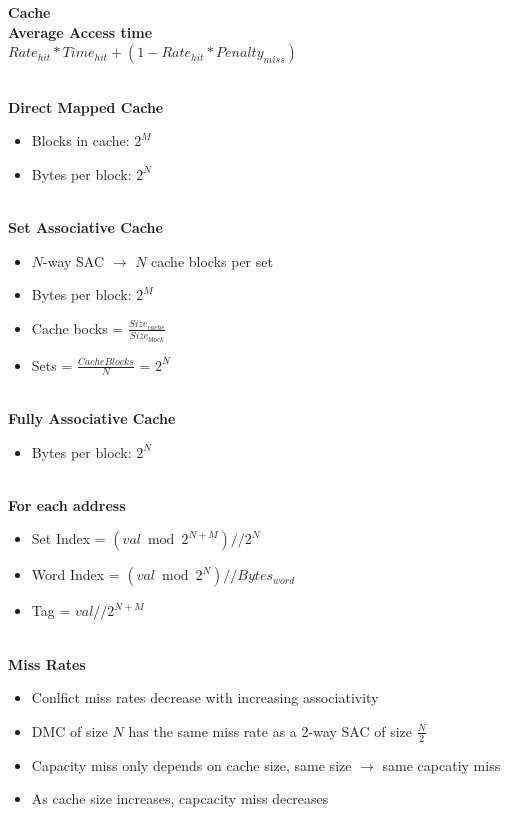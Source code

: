 \documentclass[a4paper]{article} \usepackage[backend=biber, style=numeric, sorting=none]{biblatex}
\begin{document}
\begin{multicols*}{4}
{\small\textbf{Cache}}
\\ \textbf{{Average Access time}}
\\ $Rate_{hit} * Time_{hit} + (1 - Rate_{hit} * Penalty_{miss})$

\\ \textbf{{Direct Mapped Cache}}
\begin{itemize}[leftmargin=*]
\itemsep -0.5em
\item Blocks in cache: $2^M$
\item Bytes per block: $2^N$
\end{itemize}

\\ \textbf{{Set Associative Cache}}
\begin{itemize}[leftmargin=*]
\itemsep -0.5em
\item $N$-way SAC $\rightarrow$ $N$ cache blocks per set
\item Bytes per block: $2^M$
\item Cache bocks = $\frac{Size_{cache}}{Size_{block}}$
\item Sets = $\frac{CacheBlocks}{N}$ = $2^N$
\end{itemize}

\\ \textbf{{Fully Associative Cache}}
\begin{itemize}[leftmargin=*]
\itemsep -0.5em
\item Bytes per block: $2^N$
\end{itemize}

\\ \textbf{{For each address}}
\begin{itemize}[leftmargin=*]
\itemsep -0.5em
\item Set Index =  $(val \bmod 2^{N + M}) // 2^N$
\item Word Index =  $(val \bmod 2^{N}) // Bytes_{word}$
\item Tag =  $val // 2^{N + M}$
\end{itemize}

\\ \textbf{{Miss Rates}}
\begin{itemize}[leftmargin=*]
\itemsep -0.5em
\item Conlfict miss rates decrease with increasing associativity
\item DMC of size $N$ has the same miss rate as a 2-way SAC of size $\frac{N}{2}$
\item Capacity miss only depends on cache size, same size $\rightarrow$ same capcatiy miss
\item As cache size increases, capcacity miss decreases
\end{itemize}


\end{multicols*}
\end{document}
